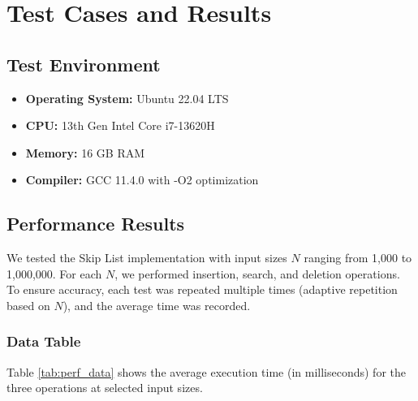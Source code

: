 \documentclass[a4paper,12pt]{article}
\begin{document}
\section{Test Cases and Results}

\subsection{Test Environment}
\begin{itemize}
    \item \textbf{Operating System:} Ubuntu 22.04 LTS
    \item \textbf{CPU:} 13th Gen Intel Core i7-13620H
    \item \textbf{Memory:} 16 GB RAM
    \item \textbf{Compiler:} GCC 11.4.0 with -O2 optimization
\end{itemize}

\subsection{Performance Results}

We tested the Skip List implementation with input sizes $N$ ranging from 1,000 to 1,000,000. For each $N$, we performed insertion, search, and deletion operations. To ensure accuracy, each test was repeated multiple times (adaptive repetition based on $N$), and the average time was recorded.

\subsubsection{Data Table}
Table \ref{tab:perf_data} shows the average execution time (in milliseconds) for the three operations at selected input sizes.
\end{document}
